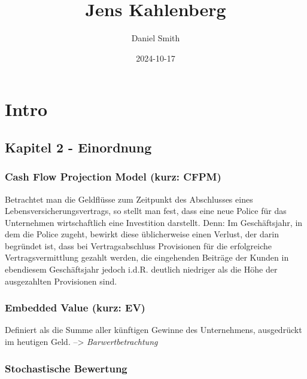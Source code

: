 \documentclass[
]{article}
\title{Jens Kahlenberg}
\author{Daniel Smith}
\date{2024-10-17}
\begin{document}
\maketitle

\hypertarget{intro}{%
\section{Intro}\label{intro}}

\hypertarget{kapitel-2---einordnung}{%
\subsection{Kapitel 2 - Einordnung}\label{kapitel-2---einordnung}}

\hypertarget{cash-flow-projection-model-kurz-cfpm}{%
\subsubsection{\texorpdfstring{\textbf{Cash Flow Projection Model}
(kurz:
\textbf{CFPM})}{Cash Flow Projection Model (kurz: CFPM)}}\label{cash-flow-projection-model-kurz-cfpm}}

Betrachtet man die Geldflüsse zum Zeitpunkt des Abschlusses eines
Lebensversicherungsvertrags, so stellt man fest, dass eine neue Police
für das Unternehmen wirtschaftlich eine Investition darstellt. Denn: Im
Geschäftsjahr, in dem die Police zugeht, bewirkt diese üblicherweise
einen Verlust, der darin begründet ist, dass bei Vertragsabschluss
Provisionen für die erfolgreiche Vertragsvermittlung gezahlt werden, die
eingehenden Beiträge der Kunden in ebendiesem Geschäftsjahr jedoch
i.d.R. deutlich niedriger als die Höhe der ausgezahlten Provisionen
sind.

\hypertarget{embedded-value-kurz-ev}{%
\subsubsection{\texorpdfstring{\textbf{Embedded Value} (kurz:
\textbf{EV})}{Embedded Value (kurz: EV)}}\label{embedded-value-kurz-ev}}

Definiert als die Summe aller künftigen Gewinne des Unternehmens,
ausgedrückt im heutigen Geld. --\textgreater{} \emph{Barwertbetrachtung}

\hypertarget{stochastische-bewertung}{%
\subsubsection{Stochastische Bewertung}\label{stochastische-bewertung}}
\end{document}
